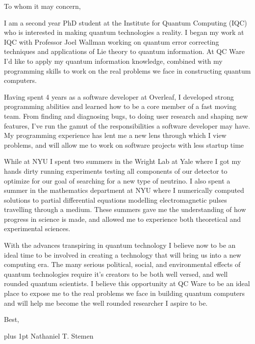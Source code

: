 \documentclass[12pt]{article}
\begin{document}
\noindent
To whom it may concern,

I am a second year PhD student at the Institute for Quantum Computing (IQC) who is interested in making quantum technologies a reality.
I began my work at IQC with Professor Joel Wallman working on quantum error correcting techniques and applications of Lie theory to quantum information.
At QC Ware I'd like to apply my quantum information knowledge, combined with my programming skills to work on the real problems we face in constructing quantum computers.

Having spent 4 years as a software developer at Overleaf, I developed strong programming abilities and learned how to be a core member of a fast moving team.
From finding and diagnosing bugs, to doing user research and shaping new features, I've run the gamut of the responsibilities a software developer may have.
My programming experience has lent me a new lens through which I view problems, and will allow me to work on software projects with less startup time

While at NYU I spent two summers in the Wright Lab at Yale where I got my hands dirty running experiments testing all components of our detector to optimize for our goal of searching for a new type of neutrino.
I also spent a summer in the mathematics department at NYU where I numerically computed solutions to partial differential equations modelling electromagnetic pulses travelling through a medium.
These summers gave me the understanding of how progress in science is made, and allowed me to experience both theoretical and experimental sciences.

With the advances transpiring in quantum technology I believe now to be an ideal time to be involved in creating a technology that will bring us into a new computing era.
The many serious political, social, and environmental effects of quantum technologies require it's creators to be both well versed, and well rounded quantum scientists.
I believe this opportunity at QC Ware to be an ideal place to expose me to the real problems we face in building quantum computers and will help me become the well rounded researcher I aspire to be.

\noindent
Best,

\parskip=0pt plus 1pt
Nathaniel T. Stemen
\end{document}
